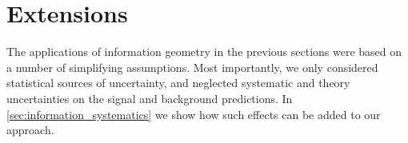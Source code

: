 









\section{Extensions}
\label{sec:information_extensions}

The applications of information geometry in the previous sections were
based on a number of simplifying assumptions. Most importantly, we
only considered statistical sources of uncertainty, and neglected
systematic and theory uncertainties on the signal and background
predictions. In \autoref{sec:information_systematics} we show how such
effects can be added to our approach.

